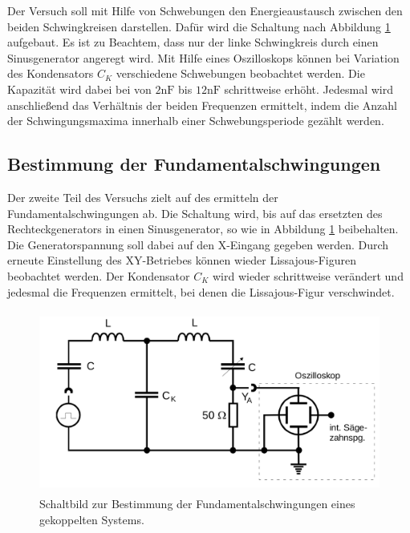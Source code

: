 Der Versuch soll mit Hilfe von Schwebungen den Energieaustausch zwischen den beiden Schwingkreisen darstellen.
Dafür wird die Schaltung nach Abbildung \ref{fig:bild6} aufgebaut. Es ist zu Beachtem, dass nur der linke Schwingkreis durch einen Sinusgenerator angeregt wird.
Mit Hilfe eines Oszilloskops können bei Variation des 
Kondensators $C_K$ verschiedene Schwebungen beobachtet werden. Die Kapazität wird dabei bei von $2\si{\nano\farad}$  bis $12\si{\nano\farad}$
schrittweise erhöht. Jedesmal wird anschließend das Verhältnis der beiden Frequenzen ermittelt, indem die Anzahl der Schwingungsmaxima innerhalb einer Schwebungsperiode 
gezählt werden.


\subsection{Bestimmung der Fundamentalschwingungen}
\label{sub:Bestimmung der Fundamentalschwingungen}



Der zweite Teil des Versuchs zielt auf des ermitteln der Fundamentalschwingungen ab. Die Schaltung wird, bis auf das ersetzten des Rechteckgenerators in
einen Sinusgenerator, so wie in Abbildung \ref{fig:bild6} beibehalten. Die Generatorspannung soll dabei auf den X-Eingang gegeben werden.
Durch erneute Einstellung des XY-Betriebes können wieder Lissajous-Figuren beobachtet werden. Der Kondensator $C_K$ wird wieder schrittweise verändert und jedesmal die Frequenzen ermittelt, bei 
denen die Lissajous-Figur verschwindet. 


\begin{figure}
\label{fig:bild6}
    \centering
    \includegraphics[height=6.0cm]{data/Bild6.png}
    \caption{Schaltbild zur Bestimmung der Fundamentalschwingungen eines gekoppelten Systems.}
\end{figure}





